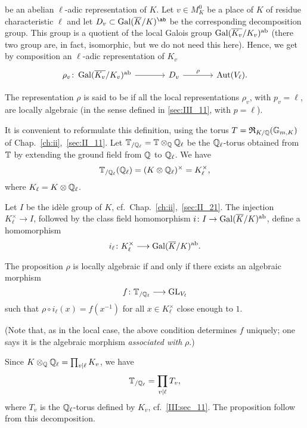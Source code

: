 be an abelian $\ell$-adic representation of $K$. Let $v \in M_K^0$ be a place of
$K$ of residue characteristic $\ell$ and let $D_v \subset
\Gal(\algcl{K}/K)^{\ab}$ be the corresponding decomposition group. This group
is a quotient of the local Galois group $\operatorname{Gal}(\overline{K_v}/K_v)^{\mathrm{ab}}$ (there
two group are, in fact, isomorphic, but we do not need this here). Hence, we
get by composition an $\ell$-adic representation of $K_v$ 
\[\begin{tikzcd}[sep=large]
	\rho_v \colon \abcl{\Gal(\algcl{K_v}/K_v)} \rar & D_v \rar["\rho"] &
	\Aut(V_\ell).
\end{tikzcd}\]

\begin{mydef}
The representation $\rho$ is said to be  if all the
local representations $\rho_v$, with $p_v = \ell$, are locally algebraic (in the
sense defined in \ref{sec:III_11}, with $p = \ell$). 
\end{mydef}

It is convenient to reformulate this definition, using the torus $T =
\operatorname{\mathfrak{R}}_{K/\mathbb{Q}} (\mathbb{G}_{m, K})$ of Chap.~\ref{ch:ii},~\ref{sec:II_11}. Let
$\mathbb{T}_{/\mathbb{Q}_\ell} = \mathbb{T} \otimes_{\mathbb{Q}} \mathbb{Q}_\ell$ be the $\mathbb{Q}_\ell$-torus obtained
from $\mathbb{T}$ by extending the ground field from $\mathbb{Q}$ to $\mathbb{Q}_\ell$. We have
\[
\mathbb{T}_{/\mathbb{Q}_\ell}(\mathbb{Q}_\ell) = (K \otimes \mathbb{Q}_\ell)^{\times} = K_{\ell}^\times,
\]
where $K_\ell = K \otimes \mathbb{Q}_\ell$. 

Let $I$ be the idèle group of $K$, cf.\ Chap.~\ref{ch:ii},~\ref{sec:II_21}. The
injection $K_\ell^\times \to I$, followed by the class field homomorphism $i
\colon I \to \operatorname{Gal}(\overline{K}/K)^{\mathrm{ab}}$, define a homomorphism
\[
i_\ell \colon K_\ell^\times \longrightarrow \operatorname{Gal}(\overline{K}/K)^{\mathrm{ab}}.
\]

\begin{prop}
The proposition $\rho$ is locally algebraic if and only if there exists an
algebraic morphism 
\[
f \colon \mathbb{T}_{/\mathbb{Q}_\ell} \longrightarrow \operatorname{GL}_{V_\ell}
\]
such that $\rho \circ i_\ell(x) = f(x^{-1})$ for all $x \in K_\ell^\times$
close enough to $1$. 
\end{prop}

(Note that, as in the local case, the above condition determines $f$ uniquely;
one says it is the algebraic morphism \emph{associated with} $\rho$.)

Since $K \otimes_{\mathbb{Q}} \mathbb{Q}_\ell = \prod_{v \mid \ell} K_v$, we have 
\[
\mathbb{T}_{/\mathbb{Q}_\ell} = \prod_{v \mid \ell} T_v,
\]
where $T_v$ is the $\mathbb{Q}_\ell$-torus defined by $K_v$, cf.~\ref{III:sec_11}. The 
proposition follow from this decomposition. 

